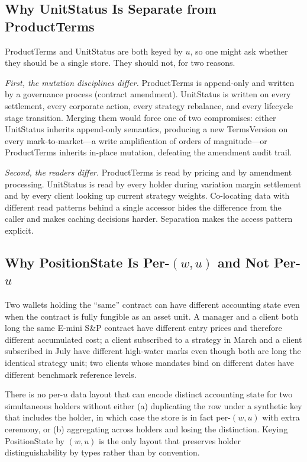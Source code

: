 \documentclass[11pt,a4paper]{article}
\begin{document}
\subsection{Why UnitStatus Is Separate from ProductTerms}

ProductTerms and UnitStatus are both keyed by $u$, so one might ask whether they should be a single store. They should not, for two reasons.

\emph{First, the mutation disciplines differ.} ProductTerms is append-only and written by a governance process (contract amendment). UnitStatus is written on every settlement, every corporate action, every strategy rebalance, and every lifecycle stage transition. Merging them would force one of two compromises: either UnitStatus inherits append-only semantics, producing a new TermsVersion on every mark-to-market---a write amplification of orders of magnitude---or ProductTerms inherits in-place mutation, defeating the amendment audit trail.

\emph{Second, the readers differ.} ProductTerms is read by pricing and by amendment processing. UnitStatus is read by every holder during variation margin settlement and by every client looking up current strategy weights. Co-locating data with different read patterns behind a single accessor hides the difference from the caller and makes caching decisions harder. Separation makes the access pattern explicit.

\subsection{Why PositionState Is Per-$(w,u)$ and Not Per-$u$}

Two wallets holding the ``same'' contract can have different accounting state even when the contract is fully fungible as an asset unit. A manager and a client both long the same E-mini S\&P contract have different entry prices and therefore different accumulated cost; a client subscribed to a strategy in March and a client subscribed in July have different high-water marks even though both are long the identical strategy unit; two clients whose mandates bind on different dates have different benchmark reference levels.

There is no per-$u$ data layout that can encode distinct accounting state for two simultaneous holders without either (a) duplicating the row under a synthetic key that includes the holder, in which case the store is in fact per-$(w, u)$ with extra ceremony, or (b) aggregating across holders and losing the distinction. Keying PositionState by $(w, u)$ is the only layout that preserves holder distinguishability by types rather than by convention.
\end{document}
